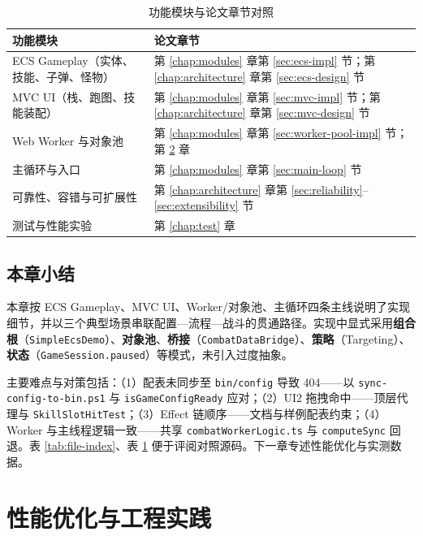 \documentclass[UTF8,a4paper]{ctexart}
\begin{document}
\begin{table}[htbp]
  
  \caption{功能模块与论文章节对照}
  \label{tab:module-chapter-map}
  \begin{tabular}{p{4.0cm}p{8.5cm}}
    \toprule
    \textbf{功能模块} & \textbf{论文章节} \\
    \midrule
    ECS Gameplay（实体、技能、子弹、怪物） & 第 \ref{chap:modules} 章第 \ref{sec:ecs-impl} 节；第 \ref{chap:architecture} 章第 \ref{sec:ecs-design} 节 \\
    MVC UI（栈、跑图、技能装配） & 第 \ref{chap:modules} 章第 \ref{sec:mvc-impl} 节；第 \ref{chap:architecture} 章第 \ref{sec:mvc-design} 节 \\
    Web Worker 与对象池 & 第 \ref{chap:modules} 章第 \ref{sec:worker-pool-impl} 节；第 \ref{chap:performance} 章 \\
    主循环与入口 & 第 \ref{chap:modules} 章第 \ref{sec:main-loop} 节 \\
    可靠性、容错与可扩展性 & 第 \ref{chap:architecture} 章第 \ref{sec:reliability}--\ref{sec:extensibility} 节 \\
    测试与性能实验 & 第 \ref{chap:test} 章 \\
    \bottomrule
  \end{tabular}
\end{table}

\section{本章小结}

本章按 ECS Gameplay、MVC UI、Worker/对象池、主循环四条主线说明了实现细节，并以三个典型场景串联配置—流程—战斗的贯通路径。实现中显式采用\textbf{组合根}（\texttt{SimpleEcsDemo}）、\textbf{对象池}、\textbf{桥接}（\texttt{CombatDataBridge}）、\textbf{策略}（Targeting）、\textbf{状态}（\texttt{GameSession.paused}）等模式，未引入过度抽象。

主要难点与对策包括：（1）配表未同步至 \texttt{bin/config} 导致 404——以 \texttt{sync-config-to-bin.ps1} 与 \texttt{isGameConfigReady} 应对；（2）UI2 拖拽命中——顶层代理与 \texttt{SkillSlotHitTest}；（3）Effect 链顺序——文档与样例配表约束；（4）Worker 与主线程逻辑一致——共享 \texttt{combatWorkerLogic.ts} 与 \texttt{computeSync} 回退。表 \ref{tab:file-index}、表 \ref{tab:module-chapter-map} 便于评阅对照源码。下一章专述性能优化与实测数据。

\chapter{性能优化与工程实践}
\label{chap:performance}
\end{document}
